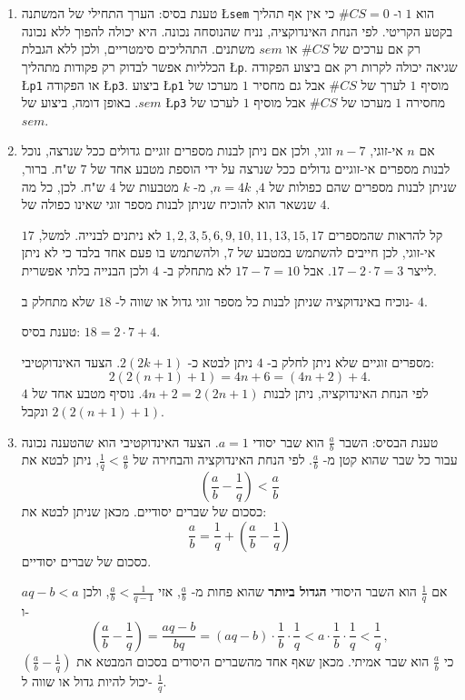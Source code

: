\begin{enumerate}
\item
טענת בסיס: הערך התחילי של המשתנה 
\L{\texttt{sem}}
הוא
$1$
ו-
$\#\mathit{CS}=0$
כי אין אף תהליך בקטע הקריטי. לפי הנחת האינדוקציה, נניח שהנוסחה נכונה. היא יכולה להפוך ללא נכונה רק אם ערכים של
$\#\mathit{CS}$
או
$\mathit{sem}$
משתנים. התהליכים סימטריים, ולכן ללא הגבלת הכלליות אפשר לבדוק רק פקודות מתהליך
\L{\texttt{p}}.
שגיאה יכולה לקרות רק אם ביצוע הפקודה
\L{\texttt{p1}}
או הפקודה
\L{\texttt{p3}}.
ביצוע
\L{\texttt{p1}}
מוסיף
$1$
לערך של
$\#\mathit{CS}$
אבל גם מחסיר 
$1$ 
מערכו של
$\mathit{sem}$.
באופן דומה, ביצוע של
\L{\texttt{p3}} 
מחסירה
$1$
מערכו של
$\#\mathit{CS}$
אבל מוסיף
$1$
לערכו של
$\mathit{sem}$.


\item 
אם
$n$
אי-זוגי,
$n-7$
זוגי, ולכן אם ניתן לבנות מספרים זוגיים גדולים ככל שנרצה, נוכל לבנות מספרים אי-זוגיים גדולים ככל שנרצה על ידי הוספת מטבע אחד של
$7$
ש"ח. ברור, שניתן לבנות מספרים שהם כפולות של
$4$, $n=4k$,
מ-%
$k$
מטבעות של
$4$
ש"ח. לכן, כל מה שנשאר הוא להוכיח שניתן לבנות מספר זוגי שאינו כפולה של
$4$.

קל להראות שהמספרים
$1,2,3,5,6,9,10,11,13,15,17$
לא ניתנים לבנייה. למשל, 
$17$
אי-זוגי, לכן חייבים להשתמש במטבע של 
$7$,
ולהשתמש בו פעם אחד בלבד כי לא ניתן לייצר
$17-2\cdot 7=3$.
אבל
$17-7=10$
לא מתחלק ב-%
$4$
ולכן הבנייה בלתי אפשרית.

נוכיח באינדוקציה שניתן לבנות כל מספר זוגי גדול או שווה ל-%
$18$
שלא מתחלק ב-%
$4$.

טענת בסיס:
$18=2\cdot 7 + 4$.

מספרים זוגיים שלא ניתן לחלק ב-%
$4$
ניתן לבטא כ-%
$2(2k+1)$.
הצעד האינדוקטיבי:
\[
2(2(n+1)+1) = 4n+6 = (4n+2)+4.
\]
לפי הנחת האינדוקציה, ניתן לבנות
$4n+2=2(2n+1)$.
נוסיף מטבע אחד של
$4$
ונקבל
$2(2(n+1)+1)$.

\item
טענת הבסיס: השבר
$\frac{a}{b}$
הוא שבר יסודי
$a=1$.
הצעד האינדוקטיבי הוא שהטענה נכונה עבור כל שבר שהוא קטן מ-%
$\frac{a}{b}$.
לפי הנחת האינדוקציה והבחירה של
$\frac{1}{q} < \frac{a}{b}$,
ניתן לבטא את
\[
\left( \frac{a}{b} - \frac{1}{q} \right) < \frac{a}{b}
\]
כסכום של שברים יסודיים. מכאן שניתן לבטא את:
\[
\frac{a}{b} = \frac{1}{q} + \left( \frac{a}{b} - \frac{1}{q} \right)
\]
כסכום של שברים יסודיים.

אם
$\frac{1}{q}$
הוא השבר היסודי
\textbf{הגדול ביותר}
שהוא פחות מ-%
$\frac{a}{b}$,
אזי
$\frac{a}{b} < \frac{1}{q-1}$,
ולכן
$aq-b < a$
ו-%
\[\left( \frac{a}{b} - \frac{1}{q} \right) = \frac{aq-b}{bq} = (aq-b)\cdot \frac{1}{b}\cdot\frac{1}{q} < a\cdot\frac{1}{b}\cdot\frac{1}{q}<\frac{1}{q}\,,
\]
כי
$\frac{a}{b}$
הוא שבר אמיתי. מכאן שאף אחד מהשברים היסודים בסכום המבטא את
$\left( \frac{a}{b} - \frac{1}{q} \right)$
יכול להיות גדול או שווה ל-%
$\frac{1}{q}$.


\end{enumerate}

